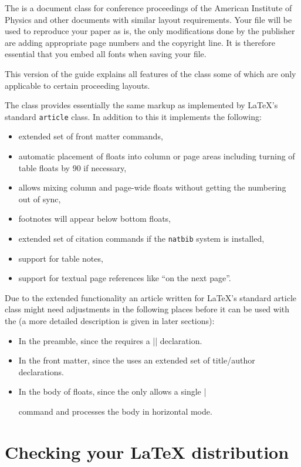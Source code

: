 The \aipcls{} is a \LaTeXe{} document class for conference proceedings
of the American Institute of Physics and other documents with similar
layout requirements.  Your file will be used to reproduce
your paper as is, the only modifications done by the publisher are
adding appropriate page numbers and the copyright line. It is
therefore essential that you embed all fonts when saving your file.

This version of the guide explains all features of the class some of
which are only applicable to certain proceeding layouts.

The class provides essentially the same markup as implemented by
\LaTeX's standard
\texttt{article} class.  In addition to this it implements the
following:
\begin{itemize}
\item extended set of front matter commands,
\item automatic placement of floats into column or page areas
  including turning of table floats by 90\textdegree{} if necessary,
\item allows mixing column and page-wide floats without getting the
  numbering out of sync,
\item footnotes will appear below bottom floats,
\item extended set of citation commands if the \texttt{natbib} system
  is installed,
\item support for table notes,
\item support for textual page references like ``on the next page''.
\end{itemize}

Due to the extended functionality an article written for \LaTeX{}'s
standard article class might need adjustments in the following places
before it can be used with the \aipcls{}
(a more detailed description is given in later sections):
\begin{itemize}
\item
  In the preamble, since the \aipcls{} requires a |\layoutstyle|
  declaration.
\item
  In the front matter, since  the \aipcls{} uses an extended set of
  title/author declarations.
\item
  In the body of floats, since the \aipcls{} only allows a single
  |\caption| command and processes the body in horizontal mode.
\end{itemize}

\section{Checking your \LaTeX{} distribution}

